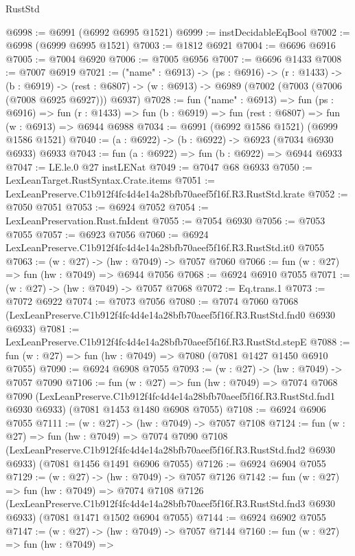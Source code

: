 \begin{lexlean}{RustStd}
\begin{coremodule}
@6998 := @6991 (@6992 @6995 @1521)
@6999 := instDecidableEqBool
@7002 := @6998 (@6999 @6995 @1521)
@7003 := @1812 @6921
@7004 := @6696 @6916
@7005 := @7004 @6920
@7006 := @7005 @6956
@7007 := @6696 @1433
@7008 := @7007 @6919
@7021 := ("name" : @6913) ->
  (ps : @6916) ->
  (r : @1433) ->
  (b : @6919) ->
  (rest : @6807) -> (w : @6913) -> @6989 (@7002 (@7003 (@7006 (@7008 @6925 @6927))) @6937)
@7028 := fun ("name" : @6913) =>
  fun (ps : @6916) =>
  fun (r : @1433) => fun (b : @6919) => fun (rest : @6807) => fun (w : @6913) => @6944 @6988
@7034 := @6991 (@6992 @1586 @1521) (@6999 @1586 @1521)
@7040 := (a : @6922) -> (b : @6922) -> @6923 (@7034 @6930 @6933) @6933
@7043 := fun (a : @6922) => fun (b : @6922) => @6944 @6933
@7047 := LE.le.{0} @27 instLENat
@7049 := @7047 @68 @6933
@7050 := LexLeanTarget.RustSyntax.Crate.items
@7051 := LexLeanPreserve.C1b912f4fc4d4e14a28bfb70aeef5f16f.R3.RustStd.krate
@7052 := @7050 @7051
@7053 := @6924 @7052
@7054 := LexLeanPreservation.Rust.fnIdent
@7055 := @7054 @6930
@7056 := @7053 @7055
@7057 := @6923 @7056
@7060 := @6924 LexLeanPreserve.C1b912f4fc4d4e14a28bfb70aeef5f16f.R3.RustStd.it0 @7055
@7063 := (w : @27) -> (hw : @7049) -> @7057 @7060
@7066 := fun (w : @27) => fun (hw : @7049) => @6944 @7056
@7068 := @6924 @6910 @7055
@7071 := (w : @27) -> (hw : @7049) -> @7057 @7068
@7072 := Eq.trans.{1}
@7073 := @7072 @6922
@7074 := @7073 @7056
@7080 := @7074
    @7060
    @7068
    (LexLeanPreserve.C1b912f4fc4d4e14a28bfb70aeef5f16f.R3.RustStd.fnd0 @6930 @6933)
@7081 := LexLeanPreserve.C1b912f4fc4d4e14a28bfb70aeef5f16f.R3.RustStd.stepE
@7088 := fun (w : @27) => fun (hw : @7049) => @7080 (@7081 @1427 @1450 @6910 @7055)
@7090 := @6924 @6908 @7055
@7093 := (w : @27) -> (hw : @7049) -> @7057 @7090
@7106 := fun (w : @27) =>
  fun (hw : @7049) =>
  @7074
    @7068
    @7090
    (LexLeanPreserve.C1b912f4fc4d4e14a28bfb70aeef5f16f.R3.RustStd.fnd1 @6930 @6933)
    (@7081 @1453 @1480 @6908 @7055)
@7108 := @6924 @6906 @7055
@7111 := (w : @27) -> (hw : @7049) -> @7057 @7108
@7124 := fun (w : @27) =>
  fun (hw : @7049) =>
  @7074
    @7090
    @7108
    (LexLeanPreserve.C1b912f4fc4d4e14a28bfb70aeef5f16f.R3.RustStd.fnd2 @6930 @6933)
    (@7081 @1456 @1491 @6906 @7055)
@7126 := @6924 @6904 @7055
@7129 := (w : @27) -> (hw : @7049) -> @7057 @7126
@7142 := fun (w : @27) =>
  fun (hw : @7049) =>
  @7074
    @7108
    @7126
    (LexLeanPreserve.C1b912f4fc4d4e14a28bfb70aeef5f16f.R3.RustStd.fnd3 @6930 @6933)
    (@7081 @1471 @1502 @6904 @7055)
@7144 := @6924 @6902 @7055
@7147 := (w : @27) -> (hw : @7049) -> @7057 @7144
@7160 := fun (w : @27) =>
  fun (hw : @7049) =>

\end{coremodule}
\end{lexlean}

